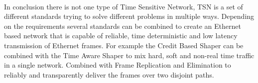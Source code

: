 \paragraph{}In conclusion there is not one type of Time Sensitive Network, TSN is a set of different standards trying to solve different problems in multiple ways. Depending on the requirements several standards can be combined to create an Ethernet based network that is capable of reliable, time deterministic and low latency transmission of Ethernet frames. For example the Credit Based Shaper can be combined with the Time Aware Shaper to mix hard, soft and non-real time traffic in a single network. Combined with Frame Replication and Elimination to reliably and transparently deliver the frames over two disjoint paths.